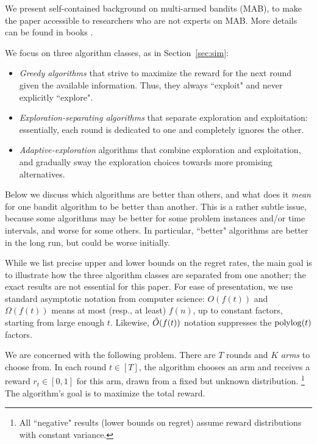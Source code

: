 We present self-contained background on multi-armed bandits (MAB), to make the paper accessible to researchers who are not experts on MAB. More details can be found in books 
\citep{Bubeck-survey12,slivkins-MABbook,LS19bandit-book}.

We focus on three algorithm classes, as in Section~\ref{sec:sim}:

\begin{itemize}
\item \emph{Greedy algorithms} that strive to maximize the reward for the next round given the available information. Thus, they always ``exploit" and never explicitly ``explore".

\item \emph{Exploration-separating algorithms}
 that separate exploration and exploitation: essentially, each round is dedicated to one and completely ignores the other.

\item \emph{Adaptive-exploration} algorithms that combine exploration and exploitation, and gradually sway the exploration choices towards more promising alternatives.
\end{itemize}

Below we discuss which algorithms are better than others, and what does it \emph{mean} for one bandit algorithm to be better than another. This is a rather subtle issue, because some algorithms may be better for some problem instances and/or time intervals, and worse for some others. In particular, ``better" algorithms are better in the long run, but could be worse initially.

While we list precise upper and lower bounds on the regret rates, the main goal is to illustrate how the three algorithm classes are separated from one another; the exact results are not essential for this paper. For ease of presentation, we use standard asymptotic notation from computer science: $O(f(t))$ and $\Omega(f(t))$ means at most (resp., at least) $f(n)$, up to constant factors, starting from large enough $t$. Likewise, $\tilde{O}(f(t))$ notation suppresses the $\polylog(t)$ factors.



We are concerned with the following problem. There are $T$ rounds and $K$ \emph{arms} to choose from. In each round $t\in [T]$, the algorithm chooses an arm and receives a reward $r_t\in[0,1]$ for this arm, drawn from a fixed but unknown distribution.%
\footnote{All ``negative" results (\ie lower bounds on regret) assume reward distributions with constant variance.}
The algorithm's goal is to maximize the total reward.

